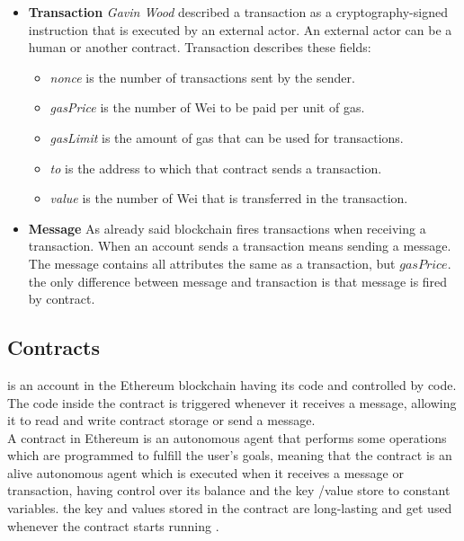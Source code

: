 \begin{itemize}
    \item \textbf{Transaction}
     \textit{Gavin Wood} described a transaction as a cryptography-signed instruction that is executed by an external actor. An external actor can be a human or another contract. Transaction describes these fields:
     \begin{itemize}
         \item \textit{nonce} is the number of transactions sent by the sender.
         \item \textit{gasPrice} is the number of Wei to be paid per unit of gas.
         \item \textit{gasLimit} is the amount of gas that can be used for transactions.
         \item \textit{to} is the address to which that contract sends a transaction.
         \item \textit{value} is the number of Wei that is transferred in the transaction.
     \end{itemize}
        \item \textbf{Message}
        As already said blockchain fires transactions when receiving a transaction. When an account sends a transaction means sending a message. The message contains all attributes the same as a transaction, but $gasPrice$. the only difference between message and transaction is that message is fired by contract\cite{Egbertsen}.
\end{itemize}
\subsection{Contracts} is an account in the Ethereum blockchain having its code and controlled by code. The code inside the contract is triggered whenever it receives a message, allowing it to read and write contract storage or send a message. \\
A contract in Ethereum is an autonomous agent that performs some operations which are programmed to fulfill the user's goals, meaning that the contract is an alive autonomous agent which is executed when it receives a message or transaction, having control over its balance and the key /value store to constant variables.
the key and values stored in the contract are long-lasting and get used whenever the contract starts running \cite{Egbertsen}.

